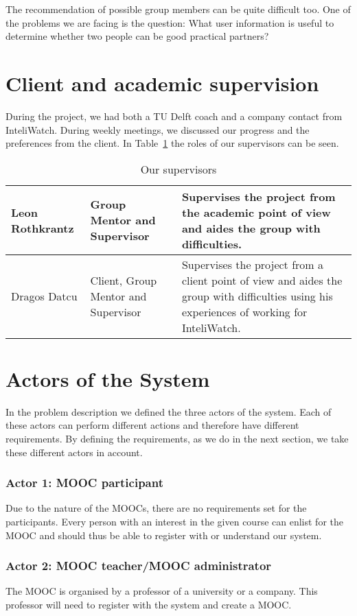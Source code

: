The recommendation of possible group members can be quite difficult too.
One of the problems we are facing is the question: What user information is useful to determine whether two people can be good practical partners?

\section{Client and academic supervision}
During the project, we had both a TU Delft coach and a company contact from InteliWatch.
During weekly meetings, we discussed our progress and the preferences from the client.
In Table~\ref{supervision} the roles of our supervisors can be seen.

\begin{table}[H]
\caption{Our supervisors}
\begin{tabular}{ | p{3cm} | p{5cm} | p{6cm} | }
 \hline
Leon Rothkrantz & Group Mentor and Supervisor & Supervises the project from the academic point of view and aides the group with difficulties.\\ \hline
Dragos Datcu &  Client, Group Mentor and Supervisor & Supervises the project from a client point of view and aides the group with difficulties using his experiences of working for InteliWatch.\\
\hline
\end{tabular}
\label{supervision}
\end{table}

\section{Actors of the System}
In the problem description we defined the three actors of the system.
Each of these actors can perform different actions and therefore have different requirements.
By defining the requirements, as we do in the next section, we take these different actors in account.

\subsubsection{Actor 1: MOOC participant}
Due to the nature of the MOOCs, there are no requirements set for the participants.
Every person with an interest in the given course can enlist for the MOOC and should thus be able to register with or understand our system.

\subsubsection{Actor 2: MOOC teacher/MOOC administrator} 
The MOOC is organised by a professor of a university or a company.
This professor will need to register with the system and create a MOOC.


